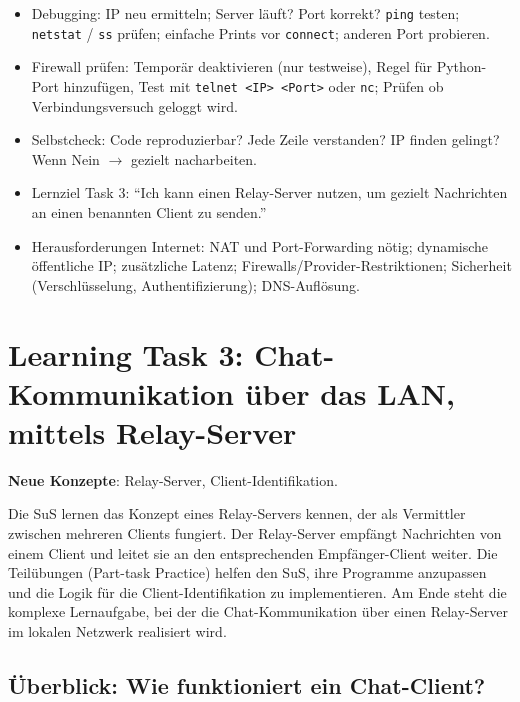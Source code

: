 \begin{myexercise}
\begin{myanswer}
\begin{itemize}
            \item Debugging: \gls{IP} neu ermitteln; Server läuft? Port korrekt? \texttt{ping} testen; \texttt{netstat} / \texttt{ss} prüfen; einfache Prints vor \texttt{connect}; anderen Port probieren.
            \item Firewall prüfen: Temporär deaktivieren (nur testweise), Regel für Python-Port hinzufügen, Test mit \texttt{telnet <IP> <Port>} oder \texttt{nc}; Prüfen ob Verbindungsversuch geloggt wird.
            \item Selbstcheck: Code reproduzierbar? Jede Zeile verstanden? IP finden gelingt? Wenn Nein $\rightarrow$ gezielt nacharbeiten.
            \item Lernziel Task 3: \enquote{Ich kann einen Relay-Server nutzen, um gezielt Nachrichten an einen benannten Client zu senden.}
            \item Herausforderungen Internet: NAT und Port-Forwarding nötig; dynamische öffentliche IP; zusätzliche Latenz; Firewalls/Provider-Restriktionen; Sicherheit (Verschlüsselung, Authentifizierung); DNS-Auflösung.
        \end{itemize}
    \end{myanswer}

\end{myexercise}
\section{Learning Task 3: Chat-Kommunikation über das LAN, mittels Relay-Server}
\begin{scaffoldBox}
    \textbf{Neue Konzepte}: Relay-Server, Client-Identifikation.

    Die SuS lernen das Konzept eines Relay-Servers kennen, der als Vermittler zwischen mehreren Clients fungiert. Der Relay-Server empfängt Nachrichten von einem Client und leitet sie an den entsprechenden Empfänger-Client weiter. Die Teilübungen (Part-task Practice) helfen den SuS, ihre Programme anzupassen und die Logik für die Client-Identifikation zu implementieren. Am Ende steht die komplexe Lernaufgabe, bei der die Chat-Kommunikation über einen Relay-Server im lokalen Netzwerk realisiert wird.
\end{scaffoldBox}



\subsection{Überblick: Wie funktioniert ein Chat-Client?}


